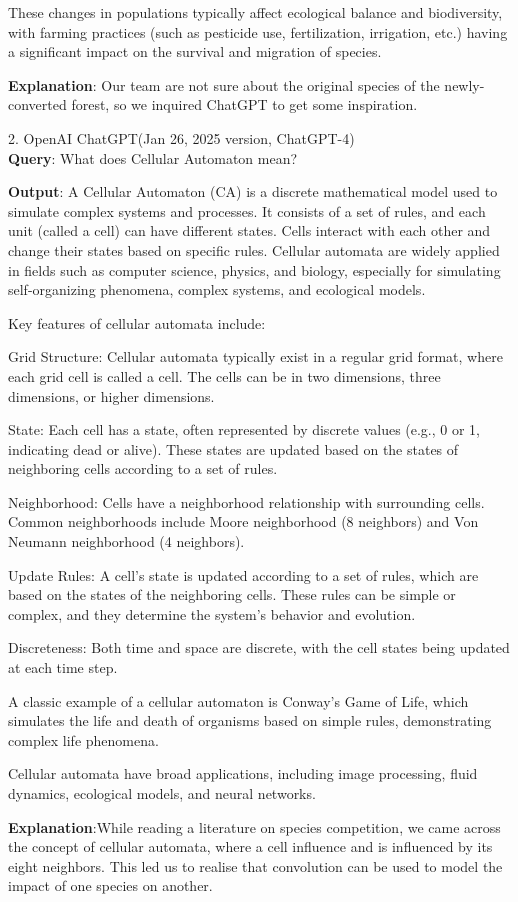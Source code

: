 \documentclass[12pt]{article}
\begin{document}
These changes in populations typically affect ecological balance and biodiversity, with farming practices (such as pesticide use, fertilization, irrigation, etc.) having a significant impact on the survival and migration of species.

\textbf{Explanation}: Our team are not sure about the original species of the newly-converted forest, so we inquired ChatGPT to get some inspiration.

2. OpenAI ChatGPT(Jan 26, 2025 version, ChatGPT-4)\\
\hspace{2em}\textbf{Query}: What does Cellular Automaton mean?

\textbf{Output}: A Cellular Automaton (CA) is a discrete mathematical model used to simulate complex systems and processes. It consists of a set of rules, and each unit (called a cell) can have different states. Cells interact with each other and change their states based on specific rules. Cellular automata are widely applied in fields such as computer science, physics, and biology, especially for simulating self-organizing phenomena, complex systems, and ecological models.

Key features of cellular automata include:

Grid Structure: Cellular automata typically exist in a regular grid format, where each grid cell is called a cell. The cells can be in two dimensions, three dimensions, or higher dimensions.

State: Each cell has a state, often represented by discrete values (e.g., 0 or 1, indicating dead or alive). These states are updated based on the states of neighboring cells according to a set of rules.

Neighborhood: Cells have a neighborhood relationship with surrounding cells. Common neighborhoods include Moore neighborhood (8 neighbors) and Von Neumann neighborhood (4 neighbors).

Update Rules: A cell's state is updated according to a set of rules, which are based on the states of the neighboring cells. These rules can be simple or complex, and they determine the system's behavior and evolution.

Discreteness: Both time and space are discrete, with the cell states being updated at each time step.

A classic example of a cellular automaton is Conway's Game of Life, which simulates the life and death of organisms based on simple rules, demonstrating complex life phenomena.

Cellular automata have broad applications, including image processing, fluid dynamics, ecological models, and neural networks.

\textbf{Explanation}:While reading a literature on species competition, we came across the concept of cellular automata, where a cell influence and is influenced by its eight neighbors. This led us to realise that convolution can be used to model the impact of one species on another.

\end{document}
